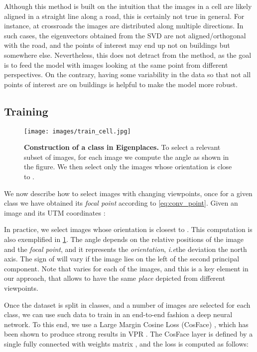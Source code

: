 \documentclass[10pt,twocolumn,letterpaper]{article}
\def\ie{\emph{i.e}\onedot}
\begin{document}
Although this method is built on the intuition that the images in a cell are likely aligned in a straight line along a road, this is certainly not true in general. For instance, at crossroads the images are distributed along multiple directions. In such cases, the eigenvectors obtained from the SVD are not aligned/orthogonal with the road, and the points of interest may end up not on buildings but somewhere else. Nevertheless, this does not detract from the method, as the goal is to feed the model with images looking at the same point from different perspectives. On the contrary, having some variability in the  data so that not all points of interest are on buildings is helpful to make the model more robust.



\subsection{Training}
\label{sec:training}

\begin{figure}
    \begin{center}
    \texttt{[image: images/train\_cell.jpg]}
    \end{center}
    \caption{\textbf{Construction of a class in Eigenplaces.}
    To select a relevant subset of images, for each image we compute the angle  as shown in the figure. We then select only the images whose orientation is close to .
    }
    \label{fig:train_cell}
\end{figure}

We now describe how to select images with changing viewpoints, once for a given class  we have obtained its \textit{focal point}  according to \cref{eq:conv_point}. Given an image  and its UTM coordinates :


In practice, we select images whose orientation is closest to . This computation is also exemplified in \cref{fig:train_cell}. The angle  depends on the relative positions of the image and the \textit{focal point}, and it represents the \textit{orientation}, \ie the deviation \wrt the north axis. The sign of  will vary if the image lies on the left of the second principal component.
Note that  varies for each of the images, and this is a key element in our approach, that allows to have the same \textit{place} depicted from different viewpoints.

Once the dataset is split in classes, and a number of images are selected for each class, we can use such data to train in an end-to-end fashion a deep neural network.
To this end, we use a Large Margin Cosine Loss (CosFace) \cite{Wang_2018_cosFace}, which has been shown to produce strong results in VPR \cite{Berton_2022_cosPlace}.
The CosFace layer is defined by a single fully connected with weights matrix , and the loss is computed as follows:
\end{document}
